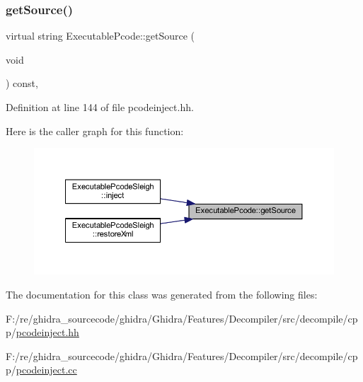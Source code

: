 \subsubsection{\texorpdfstring{getSource()}{getSource()}}
{\footnotesize\ttfamily virtual string Executable\+Pcode\+::get\+Source (\begin{DoxyParamCaption}\item[{void}]{ }\end{DoxyParamCaption}) const\hspace{0.3cm}{\ttfamily [inline]}, {\ttfamily [virtual]}}



Definition at line 144 of file pcodeinject.\+hh.

Here is the caller graph for this function\+:
\nopagebreak
\begin{figure}[H]
\begin{center}
\leavevmode
\includegraphics[width=350pt]{class_executable_pcode_a778beba39ea7ee969febbfce992d6600_icgraph}
\end{center}
\end{figure}


The documentation for this class was generated from the following files\+:\begin{DoxyCompactItemize}
\item 
F\+:/re/ghidra\+\_\+sourcecode/ghidra/\+Ghidra/\+Features/\+Decompiler/src/decompile/cpp/\mbox{\hyperlink{pcodeinject_8hh}{pcodeinject.\+hh}}\item 
F\+:/re/ghidra\+\_\+sourcecode/ghidra/\+Ghidra/\+Features/\+Decompiler/src/decompile/cpp/\mbox{\hyperlink{pcodeinject_8cc}{pcodeinject.\+cc}}\end{DoxyCompactItemize}
